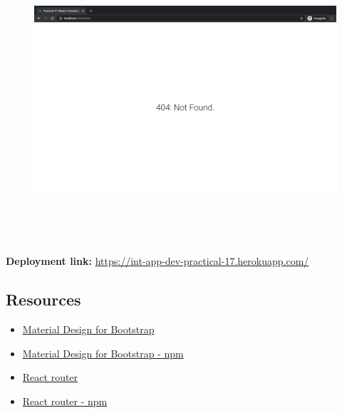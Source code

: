 \documentclass{article}
\begin{document}
\begin{figure}[H]
  \includegraphics[width=175mm, height=105mm]{./img/17-expected-form-3.png}
\end{figure}

\textbf{Deployment link:} \href{https://int-app-dev-practical-17.herokuapp.com/}{https://int-app-dev-practical-17.herokuapp.com/} 

\subsection*{Resources} 
\begin{itemize}
  \item \href{https://mdbootstrap.com/}{Material Design for Bootstrap}
  \item \href{https://www.npmjs.com/package/mdbreact/}{Material Design for Bootstrap - npm}
  \item \href{https://reactrouter.com}{React router}
  \item \href{https://www.npmjs.com/package/react-router/}{React router - npm}
\end{itemize}
 
\end{document}
